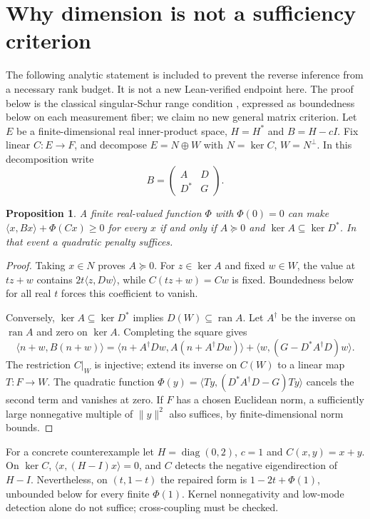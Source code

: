 \documentclass[11pt]{article}
\newtheorem{proposition}[theorem]{Proposition}
\newcommand{\ip}[2]{\langle #1,#2\rangle}
\begin{document}
\section{Why dimension is not a sufficiency criterion}
The following analytic statement is included to prevent the reverse inference
from a necessary rank budget. It is not a new Lean-verified endpoint here. The proof below is the classical
singular-Schur range condition \cite{albert,carlson}, expressed as boundedness
below on each measurement fiber; we claim no new general matrix criterion.
Let $E$ be a finite-dimensional real inner-product space, $H=H^*$ and
$B=H-cI$. Fix linear $C:E\to F$, and decompose $E=N\oplus W$ with
$N=\ker C$, $W=N^\perp$. In this decomposition write
\[
 B=\begin{pmatrix}A&D\\D^*&G\end{pmatrix}.
\]
\begin{proposition}\label{prop:schur}
A finite real-valued function $\Phi$ with $\Phi(0)=0$ can make
$\ip{x}{Bx}+\Phi(Cx)\geq0$ for every $x$ if and only if
$A\succeq0$ and $\ker A\subseteq\ker D^*$. In that event a quadratic
penalty suffices.
\end{proposition}
\begin{proof}
Taking $x\in N$ proves $A\succeq0$. For $z\in\ker A$ and fixed $w\in W$,
the value at $tz+w$ contains $2t\ip{z}{Dw}$, while $C(tz+w)=Cw$ is fixed.
Boundedness below for all real $t$ forces this coefficient to vanish.

Conversely, $\ker A\subseteq\ker D^*$ implies $D(W)\subseteq\operatorname{ran}A$.
Let $A^\dagger$ be the inverse on $\operatorname{ran}A$ and zero on $\ker A$.
Completing the square gives
\[
 \ip{n+w}{B(n+w)}=
 \ip{n+A^\dagger Dw}{A(n+A^\dagger Dw)}
 +\ip{w}{(G-D^*A^\dagger D)w}.
\]
The restriction $C|_W$ is injective; extend its inverse on $C(W)$ to a
linear map $T:F\to W$. The quadratic function
$\Phi(y)=\ip{Ty}{(D^*A^\dagger D-G)Ty}$ cancels the second term and vanishes
at zero. If $F$ has a chosen Euclidean norm, a sufficiently large nonnegative
multiple of $\|y\|^2$ also suffices, by finite-dimensional norm bounds.
\end{proof}
For a concrete counterexample let $H=\operatorname{diag}(0,2)$, $c=1$ and
$C(x,y)=x+y$. On $\ker C$, $\ip{x}{(H-I)x}=0$, and $C$ detects the negative
eigendirection of $H-I$. Nevertheless, on $(t,1-t)$ the repaired form is
$1-2t+\Phi(1)$, unbounded below for every finite $\Phi(1)$.
Kernel nonnegativity and low-mode detection alone do not suffice; cross-coupling
must be checked.
\end{document}
